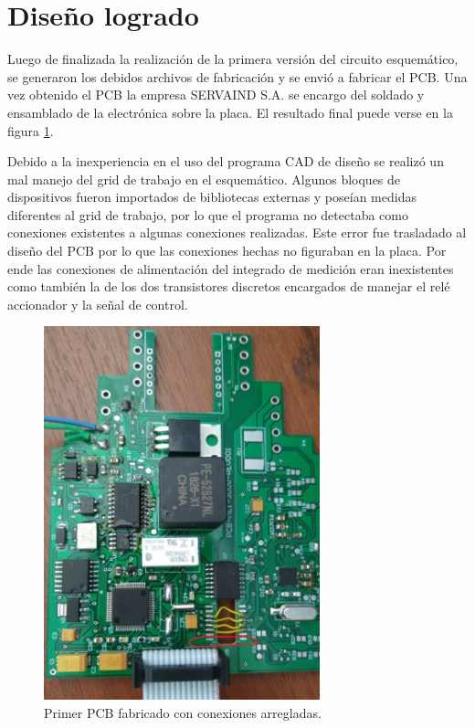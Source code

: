 \section{Diseño logrado}

Luego de finalizada la realización de la primera versión del circuito esquemático, se generaron los debidos archivos de fabricación y se envió a fabricar el PCB. Una vez obtenido el PCB la empresa SERVAIND S.A. se encargo del soldado y ensamblado de la electrónica sobre la placa. El resultado final puede verse en la figura  \ref{fig:proto1}. 

Debido a la inexperiencia en el uso del programa CAD de diseño se realizó un mal manejo del grid de trabajo en el esquemático. Algunos bloques de dispositivos fueron importados de bibliotecas externas y poseían medidas diferentes al grid de trabajo, por lo que el programa no detectaba como conexiones existentes a algunas conexiones realizadas. Este error fue trasladado al diseño del PCB por lo que las conexiones hechas no figuraban en la placa. Por ende las conexiones de alimentación del integrado de medición eran inexistentes como también la de los dos transistores discretos encargados de manejar el relé accionador y la señal de control.



\begin{figure}[!htb]
	\centering
	\includegraphics[width=80mm,keepaspectratio]{Figures/placaarmada1.jpeg}
	\caption{Primer PCB fabricado con conexiones arregladas.}
	\label{fig:proto1}
\end{figure}

